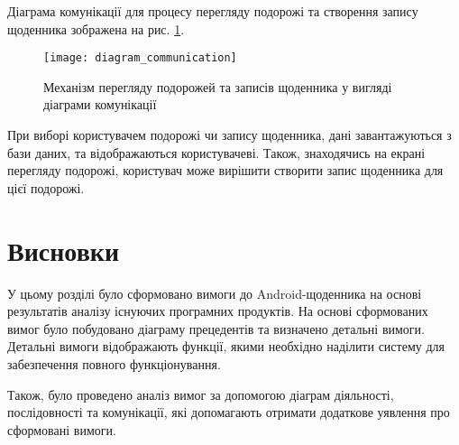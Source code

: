 \documentclass[../main.tex]{subfiles}
\begin{document}
Діаграма комунікації для процесу перегляду подорожі та створення запису щоденника зображена на рис. \ref{diagram:communication}.

\begin{figure}[H]
	\centering
	\texttt{[image: diagram\_communication]}
	\caption{Механізм перегляду подорожей та записів щоденника у вигляді діаграми комунікації}
	\label{diagram:communication}
\end{figure}

При виборі користувачем подорожі чи запису щоденника, дані завантажуються з бази даних, та відображаються користувачеві. Також, знаходячись на екрані перегляду подорожі, користувач може вирішити створити запис щоденника для цієї подорожі.

\section{Висновки}

У цьому розділі було сформовано вимоги до Android-щоденника на основі результатів аналізу існуючих програмних продуктів. На основі сформованих вимог було побудовано діаграму прецедентів та визначено  детальні вимоги. Детальні вимоги відображають функції, якими необхідно наділити систему для забезпечення повного функціонування.

Також, було проведено аналіз вимог за допомогою діаграм діяльності, послідовності та комунікації, які допомагають отримати додаткове уявлення про сформовані вимоги.
\end{document}
